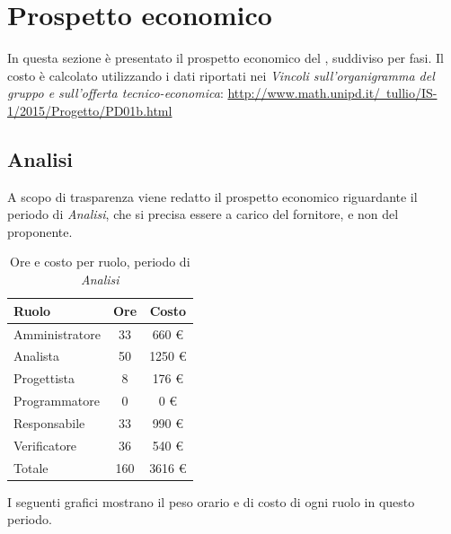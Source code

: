 \section{Prospetto economico}
In questa sezione è presentato il prospetto economico del  , suddiviso per fasi. Il costo è calcolato utilizzando i dati
riportati nei \textit{Vincoli sull’organigramma del gruppo e sull’offerta tecnico-economica}:
\href{http://www.math.unipd.it/~tullio/IS-1/2015/Progetto/PD01b.html}{http://www.math.unipd.it/~tullio/IS-1/2015/Progetto/PD01b.html}


\subsection{Analisi}
A scopo di trasparenza viene redatto il prospetto economico riguardante il periodo di \textit{Analisi}, che si precisa essere a carico del fornitore, e non del proponente.

\begin{table}[H]
	\centering
	\begin{tabular}{ l c c }
		\textbf{Ruolo} & \textbf{Ore} & \textbf{Costo} \\
		\hline
		Amministratore & 33 & 660 \euro{} \\
		Analista & 50 & 1250 \euro{} \\
		Progettista & 8 & 176 \euro{} \\
		Programmatore & 0 & 0 \euro{} \\
		Responsabile & 33 & 990 \euro{} \\
		Verificatore & 36 & 540 \euro{} \\
		\hline
		Totale & 160 & 3616 \euro{} \\
		\hline
	\end{tabular}
	\caption{Ore e costo per ruolo, periodo di \textit{Analisi}}
\end{table}

I seguenti grafici mostrano il peso orario e di costo di ogni ruolo in questo periodo.


